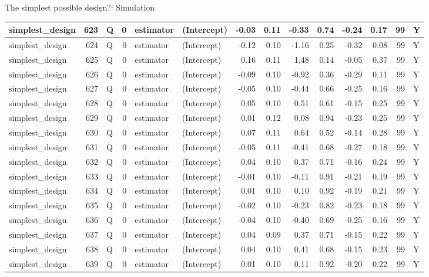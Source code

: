 \documentclass[
  11pt,
  ignorenonframetext,
]{beamer}
\begin{document}
\begin{frame}[fragile]{The simplest possible design?: Simulation}
\begin{tabular}{l|r|l|r|l|l|r|r|r|r|r|r|r|l}
\hline
simplest\_design & 623 & Q & 0 & estimator & (Intercept) & -0.03 & 0.11 & -0.33 & 0.74 & -0.24 & 0.17 & 99 & Y\\
\hline
simplest\_design & 624 & Q & 0 & estimator & (Intercept) & -0.12 & 0.10 & -1.16 & 0.25 & -0.32 & 0.08 & 99 & Y\\
\hline
simplest\_design & 625 & Q & 0 & estimator & (Intercept) & 0.16 & 0.11 & 1.48 & 0.14 & -0.05 & 0.37 & 99 & Y\\
\hline
simplest\_design & 626 & Q & 0 & estimator & (Intercept) & -0.09 & 0.10 & -0.92 & 0.36 & -0.29 & 0.11 & 99 & Y\\
\hline
simplest\_design & 627 & Q & 0 & estimator & (Intercept) & -0.05 & 0.10 & -0.44 & 0.66 & -0.25 & 0.16 & 99 & Y\\
\hline
simplest\_design & 628 & Q & 0 & estimator & (Intercept) & 0.05 & 0.10 & 0.51 & 0.61 & -0.15 & 0.25 & 99 & Y\\
\hline
simplest\_design & 629 & Q & 0 & estimator & (Intercept) & 0.01 & 0.12 & 0.08 & 0.94 & -0.23 & 0.25 & 99 & Y\\
\hline
simplest\_design & 630 & Q & 0 & estimator & (Intercept) & 0.07 & 0.11 & 0.64 & 0.52 & -0.14 & 0.28 & 99 & Y\\
\hline
simplest\_design & 631 & Q & 0 & estimator & (Intercept) & -0.05 & 0.11 & -0.41 & 0.68 & -0.27 & 0.18 & 99 & Y\\
\hline
simplest\_design & 632 & Q & 0 & estimator & (Intercept) & 0.04 & 0.10 & 0.37 & 0.71 & -0.16 & 0.24 & 99 & Y\\
\hline
simplest\_design & 633 & Q & 0 & estimator & (Intercept) & -0.01 & 0.10 & -0.11 & 0.91 & -0.21 & 0.19 & 99 & Y\\
\hline
simplest\_design & 634 & Q & 0 & estimator & (Intercept) & 0.01 & 0.10 & 0.10 & 0.92 & -0.19 & 0.21 & 99 & Y\\
\hline
simplest\_design & 635 & Q & 0 & estimator & (Intercept) & -0.02 & 0.10 & -0.23 & 0.82 & -0.23 & 0.18 & 99 & Y\\
\hline
simplest\_design & 636 & Q & 0 & estimator & (Intercept) & -0.04 & 0.10 & -0.40 & 0.69 & -0.25 & 0.16 & 99 & Y\\
\hline
simplest\_design & 637 & Q & 0 & estimator & (Intercept) & 0.04 & 0.09 & 0.37 & 0.71 & -0.15 & 0.22 & 99 & Y\\
\hline
simplest\_design & 638 & Q & 0 & estimator & (Intercept) & 0.04 & 0.10 & 0.41 & 0.68 & -0.15 & 0.23 & 99 & Y\\
\hline
simplest\_design & 639 & Q & 0 & estimator & (Intercept) & 0.01 & 0.10 & 0.11 & 0.92 & -0.20 & 0.22 & 99 & Y\\

\end{tabular}
\end{frame}
\end{document}
